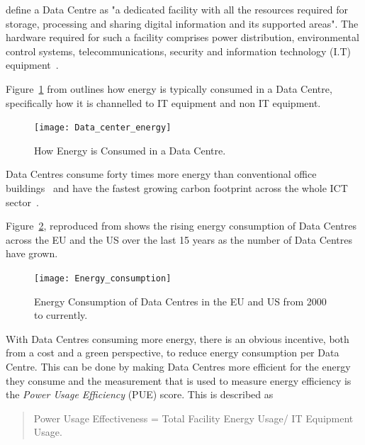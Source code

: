 \documentclass[12pt]{scrartcl}
\begin{document}
\citet{edsdoj.99f37e7899fb4fcaabdaa81e395626c420180101} define a Data Centre as "a dedicated facility with all the resources required for storage, processing and sharing digital information and its supported areas".  The hardware required for such a facility comprises power distribution, environmental control systems, telecommunications, security and information technology (I.T) equipment~\citep{edsdoj.99f37e7899fb4fcaabdaa81e395626c420180101}. 

Figure~\ref{fig:DCenergy} from \citep{edsdoj.99f37e7899fb4fcaabdaa81e395626c420180101} outlines how energy is typically consumed in a Data Centre, specifically how it is channelled to IT equipment and non IT equipment.

\begin{figure}[h]
  \caption{How Energy is Consumed in a Data Centre.}
  \label{fig:DCenergy}
  \centering
    \texttt{[image: Data\_center\_energy]}
\end{figure}


Data Centres consume forty times more energy than conventional office buildings~\citep{edsdoj.99f37e7899fb4fcaabdaa81e395626c420180101} and have the fastest growing carbon footprint across the whole ICT sector~\citep{edsbas.13818AC20170101}.

Figure~\ref{fig:DCenergyEU-US}, reproduced from \citet{edsbas.13818AC20170101} shows the rising energy consumption of Data Centres across the EU and the US over the last 15 years as the number of Data Centres have grown.

\begin{figure}[h]
  \caption{Energy Consumption of Data Centres in the EU and US from 2000 to currently.}
  \label{fig:DCenergyEU-US}
  \centering
    \texttt{[image: Energy\_consumption]}
\end{figure}

With Data Centres consuming more energy, there is an obvious incentive, both from a cost and a green perspective, to reduce energy consumption per Data Centre. This can be done by making Data Centres more efficient for the energy they consume and the measurement that is used to measure energy efficiency is the \emph{Power Usage Efficiency} (PUE) score. This is described as

\begin{quotation} 
Power Usage Effectiveness = Total Facility Energy Usage/ IT Equipment Usage.
\end{quotation}
\end{document}
